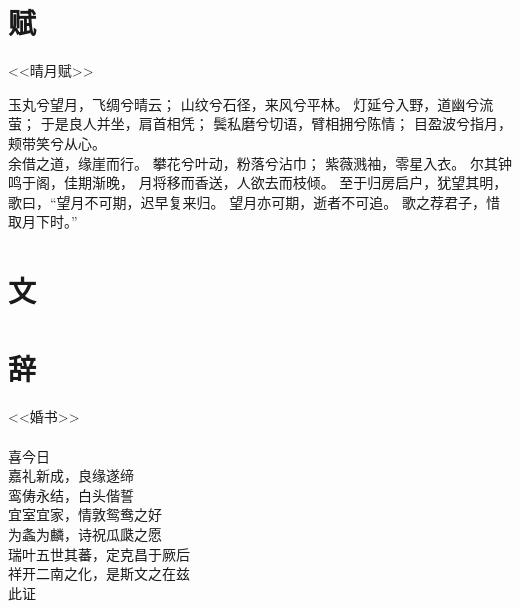 \documentclass[12pt,a4paper]{article}
\begin{document}
\section*{赋}

\begin{center}
<<晴月赋>>\\
\end{center}

玉丸兮望月，飞绸兮晴云；
山纹兮石径，来风兮平林。
灯延兮入野，道幽兮流萤；
于是良人并坐，肩首相凭；
鬓私磨兮切语，臂相拥兮陈情；
目盈波兮指月，颊带笑兮从心。\\

余借之道，缘崖而行。
攀花兮叶动，粉落兮沾巾；
紫薇溅袖，零星入衣。
尔其钟鸣于阁，佳期渐晚，
月将移而香送，人欲去而枝倾。
至于归房启户，犹望其明，
歌曰，“望月不可期，迟早复来归。
望月亦可期，逝者不可追。
歌之荐君子，惜取月下时。”

\section*{文}

\section*{辞}

\begin{center}
<<婚书>>\\
\qquad\\
喜今日\\
嘉礼新成，良缘遂缔\\
鸾俦永结，白头偕誓\\
宜室宜家，情敦鸳鸯之好\\
为螽为麟，诗祝瓜瓞之愿\\
瑞叶五世其蕃，定克昌于厥后\\
祥开二南之化，是斯文之在兹\\
此证\\
\end{center}
\end{document}
